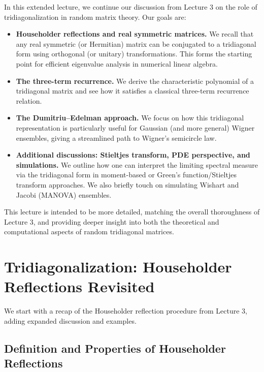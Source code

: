 \documentclass[letterpaper,11pt,oneside,reqno]{article}
\numberwithin{equation}{section}
\theoremstyle{definition}
\begin{document}
In this extended lecture, we continue our discussion from Lecture 3 on the role of tridiagonalization in random matrix theory. Our goals are:

\begin{itemize}
\item {\bf Householder reflections and real symmetric matrices.} We recall that any real symmetric (or Hermitian) matrix can be conjugated to a tridiagonal form using orthogonal (or unitary) transformations. This forms the starting point for efficient eigenvalue analysis in numerical linear algebra.
\item {\bf The three-term recurrence.} We derive the characteristic polynomial of a tridiagonal matrix and see how it satisfies a classical three-term recurrence relation.
\item {\bf The Dumitriu--Edelman approach.} We focus on how this tridiagonal representation is particularly useful for Gaussian (and more general) Wigner ensembles, giving a streamlined path to Wigner’s semicircle law.
\item {\bf Additional discussions: Stieltjes transform, PDE perspective, and simulations.} We outline how one can interpret the limiting spectral measure via the tridiagonal form in moment-based or Green’s function/Stieltjes transform approaches. We also briefly touch on simulating Wishart and Jacobi (MANOVA) ensembles.
\end{itemize}

This lecture is intended to be more detailed, matching the overall thoroughness of Lecture 3, and providing deeper insight into both the theoretical and computational aspects of random tridiagonal matrices.

\section{Tridiagonalization: Householder Reflections Revisited}
\label{sec:householder}

We start with a recap of the Householder reflection procedure from Lecture 3, adding expanded discussion and examples.

\subsection{Definition and Properties of Householder Reflections}
\end{document}

